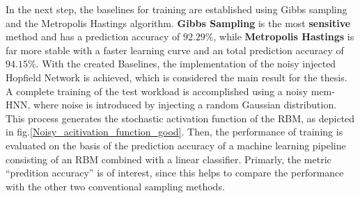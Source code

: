 In the next step, the baselines for training are established using Gibbs sampling and the Metropolis Hastings algorithm.
\textbf{Gibbs Sampling} is the most \textbf{sensitive} method and has a prediction accuracy of \(\mathbf{92.29\%}\), while
\textbf{Metropolis Hastings} is far more stable with a faster learning curve and an total prediction accuracy of \(\mathbf{94.15\%}\).
With the created Baselines, the implementation of the noisy injected Hopfield Network is achieved, which is considered the main result for the thesis. 
A complete training of the test workload is accomplished using a noisy \ac{mem-HNN}, where noise is introduced by injecting a random Gaussian distribution.
This process generates the stochastic activation function of the \ac{RBM}, as depicted in fig.\ref{Noisy_acitivation_function_good}.
Then, the performance of training is evaluated on the basis of the prediction accuracy of a machine learning pipeline consisting of an \ac{RBM} combined with a linear classifier.
Primarly, the metric ``predition accuracy'' is of interest, since this helps to compare the performance with the other two conventional sampling methods.

